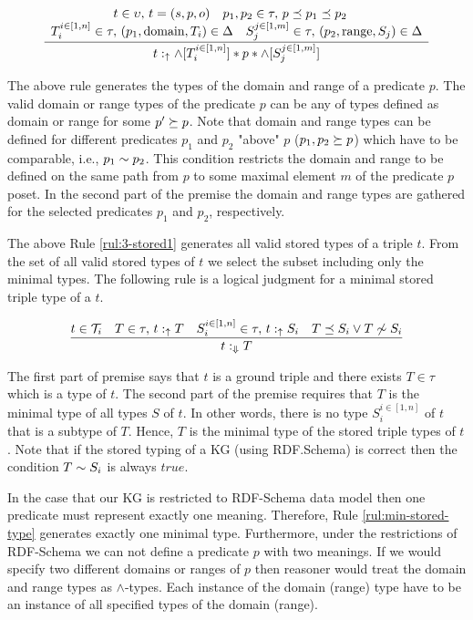 \documentclass[runningheads]{llncs}
\newcommand{\uarr}{\uparrow}
\newcommand{\Darr}{\Downarrow}
\newcommand{\T}{{\cal T}}
\begin{document}
\begin{equation}
\label{rul:3-stored1}
\dfrac{\begin{array}{c}
       t\in\upsilon,\, t=(s,p,o)\quad p_1,p_2\in\tau,\, p\preceq\/p_1\preceq\/p_2\quad \\
       T_i^{i\in[1,n]}\in\tau,\, (p_1,\text{domain},T_i)\in\/\Delta\quad S_j^{j\in[1,m]}\in\tau,\, (p_2,\text{range},S_j)\in\Delta
       \end{array}}
      {t:_\uarr\/\land[T_i^{i\in[1,n]}]*p*\land[S_j^{j\in[1,m]}]}
\end{equation}

The above rule generates the types of the domain and range of a
predicate $p$. The valid domain or range types of the predicate $p$
can be any of types defined as domain or range for some
$p'\succeq\/p$. Note that domain and range types can be defined for
different predicates $p_1$ and $p_2$ "above" $p$ ($p_1,p_2\succeq\/p$)
which have to be comparable, i.e., $p_1\sim\/p_2$. This condition
restricts the domain and range to be defined on the same path from $p$
to some maximal element $m$ of the predicate $p$ poset. In the second
part of the premise the domain and range types are gathered for the
selected predicates $p_1$ and $p_2$, respectively.

The above Rule \ref{rul:3-stored1} generates all valid stored types of
a triple $t$. From the set of all valid stored types of $t$ we select
the subset including only the minimal types. The following rule is a
logical judgment for a minimal stored triple type of a $t$. 

\begin{equation}
\label{rul:min-stored-type}
\dfrac{t\in\T_i\quad T\in\tau,\, t:_\uarr\/T\quad\/S_i^{i\in[1,n]}\in\tau,\, t:_\uarr\/S_i\quad T\preceq\/S_i\lor\/T\not\sim\/S_i}
      {t:_{\Darr}\/T}
\end{equation}

The first part of premise says that $t$ is a ground triple and there
exists $T\in\tau$ which is a type of $t$. The second part of the
premise requires that $T$ is the minimal type of all types $S$ of
$t$. In other words, there is no type $S_i^{i\in[1,n]}$ of $t$ that is
a subtype of $T$. Hence, $T$ is the minimal type of the stored triple
types of $t$. Note that if the stored typing of a KG (using
RDF.Schema) is correct then the condition $T\sim\/S_i$ is always
$true$.

In the case that our KG is restricted to RDF-Schema data model then
one predicate must represent exactly one meaning. Therefore, Rule
\ref{rul:min-stored-type} generates exactly one minimal
type. Furthermore, under the restrictions of RDF-Schema we can not
define a predicate $p$ with two meanings. If we would specify two
different domains or ranges of $p$ then reasoner would treat the
domain and range types as $\land$-types. Each instance of the domain
(range) type have to be an instance of all specified types of the
domain (range).
\end{document}
